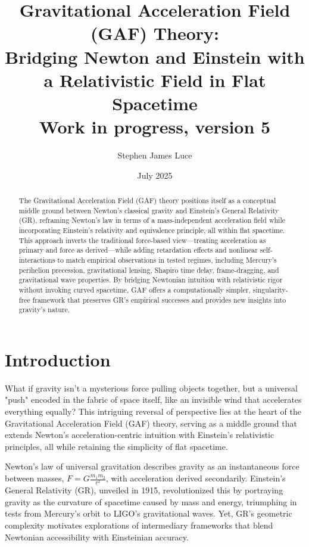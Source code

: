 \documentclass{article}
\title{Gravitational Acceleration Field (GAF) Theory: \\ Bridging Newton and Einstein with \\ a Relativistic Field in Flat Spacetime \\ \small{Work in progress, version 5}}
\author{Stephen James Luce}
\date{July 2025}
\begin{document}
\maketitle

\begin{abstract}
The Gravitational Acceleration Field (GAF) theory positions itself as a conceptual middle ground between Newton's classical gravity and Einstein's General Relativity (GR), reframing Newton's law in terms of a mass-independent acceleration field while incorporating Einstein's relativity and equivalence principle, all within flat spacetime. This approach inverts the traditional force-based view—treating acceleration as primary and force as derived—while adding retardation effects and nonlinear self-interactions to match empirical observations in tested regimes, including Mercury's perihelion precession, gravitational lensing, Shapiro time delay, frame-dragging, and gravitational wave properties. By bridging Newtonian intuition with relativistic rigor without invoking curved spacetime, GAF offers a computationally simpler, singularity-free framework that preserves GR's empirical successes and provides new insights into gravity's nature.
\end{abstract}

\section{Introduction}

What if gravity isn't a mysterious force pulling objects together, but a universal "push" encoded in the fabric of space itself, like an invisible wind that accelerates everything equally? This intriguing reversal of perspective lies at the heart of the Gravitational Acceleration Field (GAF) theory, serving as a middle ground that extends Newton's acceleration-centric intuition with Einstein's relativistic principles, all while retaining the simplicity of flat spacetime.

Newton's law of universal gravitation describes gravity as an instantaneous force between masses, \( F = G \frac{m_1 m_2}{r^2} \), with acceleration derived secondarily. Einstein's General Relativity (GR), unveiled in 1915, revolutionized this by portraying gravity as the curvature of spacetime caused by mass and energy, triumphing in tests from Mercury's orbit to LIGO's gravitational waves. Yet, GR's geometric complexity motivates explorations of intermediary frameworks that blend Newtonian accessibility with Einsteinian accuracy.
\end{document}
